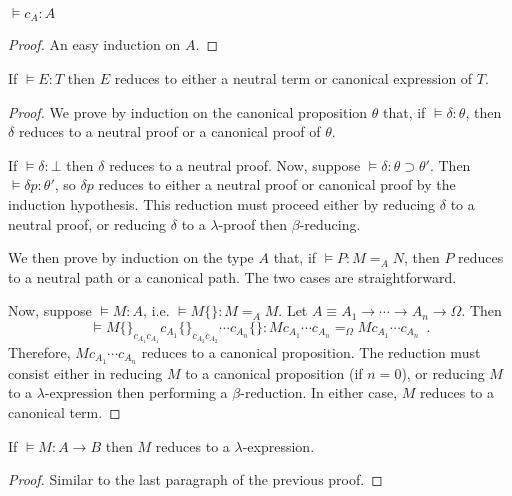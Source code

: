 \documentclass[a4paper,UKenglish]{lipics-v2016}
\theoremstyle{plain}
\theoremstyle{definition}
\begin{document}
\begin{lemma}
$\models c_A : A$
\end{lemma}

\begin{proof}
An easy induction on $A$.
\end{proof}

\begin{lemma}
\label{lm:neutral-canon}
If $\models E : T$ then $E$ reduces to either a neutral term or canonical expression of $T$.
\end{lemma}

\begin{proof}
We prove by induction on the canonical proposition $\theta$ that, if $\models \delta : \theta$, then $\delta$ reduces to a neutral proof or
a canonical proof of $\theta$.

If $\models \delta : \bot$ then $\delta$ reduces to a neutral proof.  Now, suppose $\models \delta : \theta \supset \theta'$.  Then $\models \delta p :
\theta'$, so $\delta p$ reduces to either a neutral proof or canonical proof by the induction hypothesis.  This reduction must proceed either by
reducing $\delta$ to a neutral proof, or reducing $\delta$ to a $\lambda$-proof then $\beta$-reducing.

We then prove by induction on the type $A$ that, if $\models P : M =_A N$, then $P$ reduces to a neutral path or a canonical path. The two cases are straightforward.

Now, suppose $\models M : A$, i.e. $\models M \{\} : M =_A M$.  Let $A \equiv A_1 \rightarrow \cdots \rightarrow A_n \rightarrow \Omega$.  Then
$$ \models M \{\}_{c_{A_1} c_{A_1}} c_{A_1} \{\}_{c_{A_2} c_{A_2}} \cdots c_{A_n} \{\}
: M c_{A_1} \cdots c_{A_n} =_\Omega M c_{A_1} \cdots c_{A_n} \enspace . $$
Therefore, $M c_{A_1} \cdots c_{A_n}$ reduces to a canonical proposition.  The reduction must consist either in reducing $M$ to a canonical proposition (if $n = 0$),
or reducing $M$ to a $\lambda$-expression then performing a $\beta$-reduction.  In either case, $M$ reduces to a canonical term.
\end{proof}

\begin{lemma}
\label{lm:pre-ref-compute}
If $\models M : A \rightarrow B$ then $M$ reduces to a $\lambda$-expression.
\end{lemma}

\begin{proof}
Similar to the last paragraph of the previous proof.
\end{proof}
\end{document}
